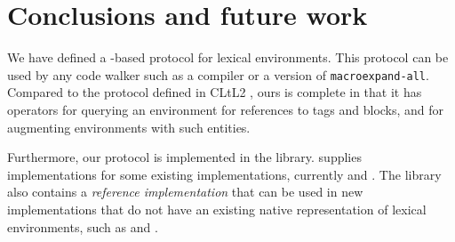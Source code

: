 \section{Conclusions and future work}

We have defined a \clos{}-based protocol for lexical environments.
This protocol can be used by any code walker such as a compiler or a
version of \texttt{macroexpand-all}.  Compared to the protocol defined
in CLtL2 \cite{Steele:1990:CLL:95411}, ours is complete in that it has
operators for querying an environment for references to tags and
blocks, and for augmenting environments with such entities.

Furthermore, our protocol is implemented in the \trucler{} library.
\trucler{} supplies implementations for some existing \commonlisp{}
implementations, currently \sbcl{} and \ccl{}.  The library also
contains a \emph{reference implementation} that can be used in new
\commonlisp{} implementations that do not have an existing native
representation of lexical environments, such as \sicl{} and \clasp{}.
